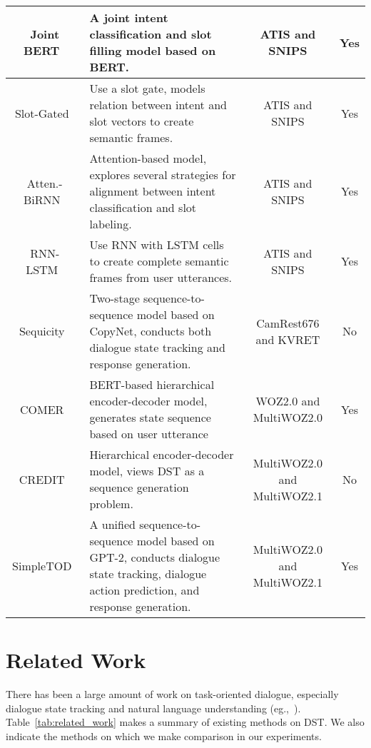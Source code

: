 \documentclass[11pt]{article}
\begin{document}
\begin{table*}[h]
{\begin{tabular}{c|p{12cm}|c|c}
Joint BERT~\citep{chen2019bert} & A joint intent classification and slot filling model based on BERT. & ATIS and SNIPS & Yes \\
\hline
Slot-Gated~\citep{goo2018slot} & Use a slot gate, models relation between intent and slot vectors to create semantic frames. & ATIS and SNIPS & Yes \\
\hline
Atten.-BiRNN~\citep{liu2016attention} & Attention-based model, explores several strategies for alignment between intent classification and slot labeling.  & ATIS and SNIPS & Yes \\
\hline
RNN-LSTM~\citep{hakkani2016multi} & Use RNN with LSTM cells to create complete semantic frames from user utterances. & ATIS and SNIPS & Yes \\
\hline
\hline
Sequicity~\cite{lei2018sequicity} & Two-stage sequence-to-sequence model based on CopyNet, conducts both dialogue state tracking and response generation. & CamRest676 and KVRET& No \\
\hline
COMER~\cite{ren2019scalable} &  BERT-based hierarchical encoder-decoder model, generates state sequence based on user utterance & WOZ2.0 and MultiWOZ2.0 & Yes \\
\hline
CREDIT~\cite{chen2020credit} & Hierarchical encoder-decoder model, views DST as a sequence generation problem.  & MultiWOZ2.0 and MultiWOZ2.1 & No \\
\hline
SimpleTOD~\cite{hosseini2020simple} & A unified sequence-to-sequence model based on GPT-2, conducts dialogue state tracking, dialogue action prediction, and response generation.  & MultiWOZ2.0 and MultiWOZ2.1 & Yes \\
\toprule
\end{tabular}
}
\caption{Summary of existing methods on DST.}
\label{tab:related_work}
\end{table*}



\section{Related Work}

There has been a large amount of work on task-oriented dialogue, especially dialogue state tracking and natural language understanding
(eg.,~\citep{zhang2020recent, huang2020challenges, chen2017survey}).
Table~\ref{tab:related_work} makes a summary of existing methods on DST. We also indicate the methods on which we make comparison in our experiments.
\end{document}
